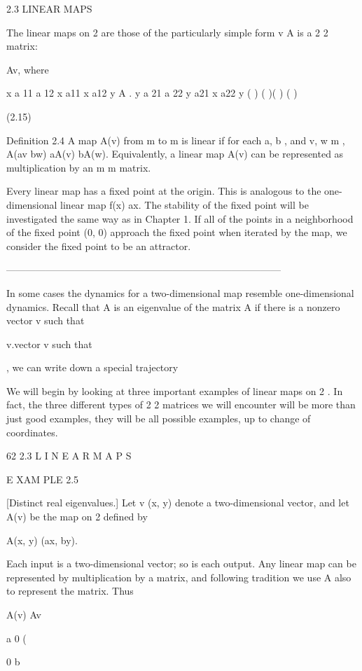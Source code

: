 \documentclass[12pt]{article}
\begin{document}
2.3 LINEAR MAPS

The linear maps on  2 are those of the particularly simple form v A is a 2 2 matrix:

Av, where

x a 11 a 12 x a11 x  a12 y A   . y a 21 a 22 y a21 x  a22 y ( ) ( )( ) ( )

(2.15)

Deﬁnition 2.4 A map A(v) from  m to  m is linear if for each a, b  , and v, w   m , A(av  bw)  aA(v)  bA(w). Equivalently, a linear 
map A(v) can be represented as multiplication by an m m matrix.

Every linear map has a ﬁxed point at the origin. This is analogous to the one-dimensional linear map f(x)  ax. The stability of the 
ﬁxed point will be investigated the same way as in Chapter 1. If all of the points in a neighborhood of the ﬁxed point (0, 0) 
approach the ﬁxed point when iterated by the map, we consider the ﬁxed point to be an attractor.

------------------------------------------------------------------------------------

In some cases the dynamics for a two-dimensional map resemble one-dimensional dynamics. 
Recall that A is an eigenvalue of the matrix A if there is a nonzero vector v such that

 v.vector v such that

 , we can write down a special trajectory





We will begin by looking at three important examples of linear maps on  2 . In fact, the three different types of 2 2 matrices we 
will encounter will be more than just good examples, they will be all possible examples, up to change of coordinates.

62 2.3 L I N E A R M A P S

E XAM PLE 2.5

[Distinct real eigenvalues.] Let v  (x, y) denote a two-dimensional vector, and let A(v) be the map on  2 deﬁned by

A(x, y)  (ax, by).

Each input is a two-dimensional vector; so is each output. Any linear map can be represented by multiplication by a matrix, and 
following tradition we use A also to represent the matrix. Thus

A(v)  Av 

a 0 (

0 b
\end{document}

